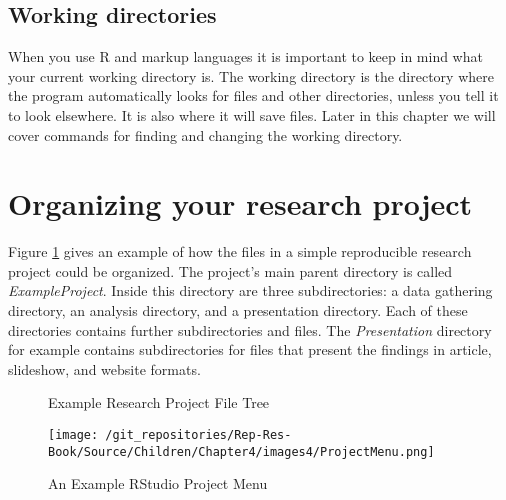 \subsection{Working directories}

When you use R and markup languages it is important to keep in mind what your current working directory is. The working directory is the directory where the program automatically looks for files and other directories, unless you tell it to look elsewhere. It is also where it will save files. Later in this chapter we will cover commands for finding and changing the working directory.

\section{Organizing your research project}

Figure \ref{ExampleTree} gives an example of how the files in a simple reproducible research project could be organized. The project's main parent directory is called {\emph{ExampleProject}}. Inside this directory are three subdirectories: a data gathering directory, an analysis directory, and a presentation directory. Each of these directories contains further subdirectories and files. The {\emph{Presentation}} directory for example contains subdirectories for files that present the findings in article, slideshow, and website formats.

\clearpage
\thispagestyle{plain}
\begin{landscape}
\begin{figure}[th!]
    \caption{Example Research Project File Tree}
    \label{ExampleTree}
    \begin{center}
    
    
    \end{center}
\end{figure}
\end{landscape}

\begin{wrapfigure}{r}{0.4\textwidth}
    \caption{An Example RStudio Project Menu}
    \label{ProjectMenu}
    \begin{center}
    \texttt{[image: /git\_repositories/Rep-Res-Book/Source/Children/Chapter4/images4/ProjectMenu.png]}
    \end{center}
\end{wrapfigure}


